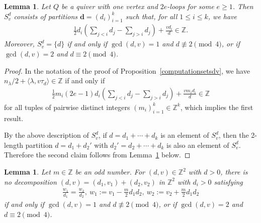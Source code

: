 \documentclass [11pt,oneside,a4paper,mathscr]{amsart}
\newtheorem{lemma}[thm]{Lemma}
\theoremstyle{definition}
\renewcommand{\leq}{\leqslant}
\renewcommand{\geq}{\geqslant}
\begin{document}
\begin{lemma}\label{lem:onevertex}
Let $Q$ be a quiver with one vertex and $2e$-loops for some $e \geq 1$. 
Then $S_v^d$ consists of partitions $\mathbf{d}=(d_i)_{i=1}^k$ such that, for all $1\leq i\leq k$, we have 
\begin{align*}
    \frac{1}{2}d_i\left( \sum_{j<i}d_j-\sum_{j>i}d_j \right)+\frac{vd_i}{d} \in \mathbb{Z}. 
\end{align*}
Moreover,
$S_{v}^d=\{d\}$ if and only if $\gcd(d, v)=1$ and $d \not\equiv 2 \pmod 4$, 
    or if $\gcd(d, v)=2$ and $d \equiv 2 \pmod 4$. 
\end{lemma}
\begin{proof}
In the notation of the proof of Proposition~\ref{computationsetsdv}, 
we have $n_{\lambda}/2+\langle \lambda, v\tau_d\rangle \in \mathbb{Z}$
if and only if
\begin{align*}
     \frac{1}{2}m_i (2e-1)d_i\left( \sum_{j<i}d_j-\sum_{j>i}d_j \right)+\frac{vm_i d_i}{d}
     \in \mathbb{Z}
\end{align*}
for all tuples of pairwise distinct integers $(m_i)_{i=1}^k \in \mathbb{Z}^k$, 
which implies the first result.    

By the above description of $S_{v}^d$,
if $d=d_1+\cdots+d_k$ is an element of $S_v^d$, then 
the 2-length partition $d=d_1+d_2'$
with $d_2'=d_2+\cdots+d_k$ is also an element of $S_v^d$. 
Therefore the second claim follows from Lemma~\ref{lem:decom} below. 
\end{proof}
\begin{lemma}\label{lem:decom}
Let $m \in \mathbb{Z}$ be an odd number. 
    For $(d, v) \in \mathbb{Z}^2$ with $d>0$, 
    there is no decomposition 
    $(d, v)=(d_1, v_1)+(d_2, v_2)$ 
    in $\mathbb{Z}^2$ with 
    $d_i>0$
    satisfying 
    \begin{align}\label{decom:d}
\frac{w_1}{d_1}=\frac{w_2}{d_2}, \ 
w_1 :=v_1-\frac{m}{2}d_1 d_2, \ 
w_2 :=v_2+\frac{m}{2}d_1 d_2
    \end{align}
    if and only if
    $\gcd(d, v)=1$ and $d \not\equiv 2 \pmod 4$, 
    or if $\gcd(d, v)=2$ and $d \equiv 2 \pmod 4$.
\end{lemma}
\end{document}

